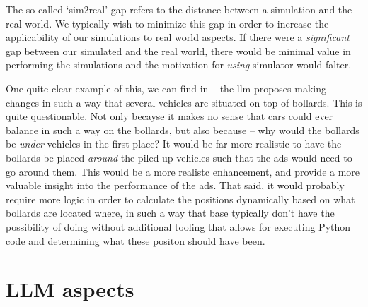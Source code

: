 The so called `sim2real'-gap refers to the distance between a simulation and the real world. We
typically wish to minimize this gap in order to increase the applicability of our simulations to
real world aspects. If there were a \emph{significant} gap between our simulated 
and the real world, there would be minimal value in performing the simulations and the motivation
for \emph{using} simulator would falter.







One quite clear example of this, we can find in
 -- the \acrshort{llm} proposes making changes
in such a way that several vehicles are situated on top of bollards. This is
quite questionable. Not only becayse it makes no sense that cars could ever
balance in such a way on the bollards, but also because -- why would the
bollards be \emph{under} vehicles in the first place? It would be far more
realistic to have the bollards be placed \emph{around} the piled-up vehicles
such that the \acrshort{ads} would need to go around them. This would be a more
realistc enhancement, and provide a more valuable insight into the performance
of the \acrshort{ads}. That said, it would probably require more logic in order
to calculate the positions dynamically based on what bollards are located where,
in such a way that base  typically don't have the possibility of
doing without additional tooling that allows for executing Python code and
determining what these positon should have been.

\section{LLM aspects}\label{sec:discussionLlmAspects}

